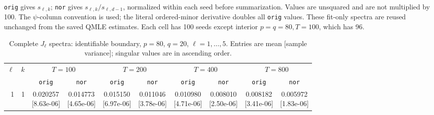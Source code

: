 \documentclass[12pt,letterpaper]{article}
\def\spacingset#1{\renewcommand{\baselinestretch}{#1}\small\normalsize}
\theoremstyle{plain}
\theoremstyle{definition}
\begin{document}
\begin{table}[p]
\begin{adjustbox}{max width=\linewidth}
\begin{tabular}{@{}rr*{8}{c}@{}}
\bottomrule
\end{tabular}
\end{adjustbox}
\par\smallskip
\begin{minipage}{0.98\linewidth}\footnotesize
\texttt{orig} gives $s_{\ell,k}$; \texttt{nor} gives $s_{\ell,k}/s_{\ell,d-1}$, normalized within each seed before summarization. Values are unsquared and are not multiplied by 100. The $\psi$-column convention is used; the literal ordered-minor derivative doubles all \texttt{orig} values. These fit-only spectra are reused unchanged from the saved QMLE estimates. Each cell has 100 seeds except interior $p=q=80,T=100$, which has 96.
\end{minipage}
\endgroup
\end{table}
\clearpage
\begin{table}[p]
\begingroup
\spacingset{1.0}
\small\centering
\caption{Complete $J_\ell$ spectra: identifiable boundary, $p=80$, $q=20$, $\ell=1,\ldots,5$. Entries are mean [sample variance]; singular values are in ascending order.}
\label{s23:lambda:alltab:spectra:p80q20boundary:1-5}
\footnotesize
\setlength{\tabcolsep}{2.2pt}
\renewcommand{\arraystretch}{1.03}
\begin{adjustbox}{max width=\linewidth}
\begin{tabular}{@{}rr*{8}{c}@{}}
\toprule
$\ell$ & $k$ & \multicolumn{2}{c}{$T=100$} & \multicolumn{2}{c}{$T=200$} & \multicolumn{2}{c}{$T=400$} & \multicolumn{2}{c}{$T=800$}\\
\cmidrule(lr){3-4}\cmidrule(lr){5-6}\cmidrule(lr){7-8}\cmidrule(lr){9-10}
 &  & \texttt{orig} & \texttt{nor} & \texttt{orig} & \texttt{nor} & \texttt{orig} & \texttt{nor} & \texttt{orig} & \texttt{nor}\\
\midrule
1 & 1 & \shortstack{0.020257\\[-1pt]{\scriptsize[8.63e-06]}} & \shortstack{0.014773\\[-1pt]{\scriptsize[4.65e-06]}} & \shortstack{0.015150\\[-1pt]{\scriptsize[6.97e-06]}} & \shortstack{0.011046\\[-1pt]{\scriptsize[3.78e-06]}} & \shortstack{0.010980\\[-1pt]{\scriptsize[4.71e-06]}} & \shortstack{0.008010\\[-1pt]{\scriptsize[2.50e-06]}} & \shortstack{0.008182\\[-1pt]{\scriptsize[3.41e-06]}} & \shortstack{0.005972\\[-1pt]{\scriptsize[1.83e-06]}}\\

\end{tabular}
\end{adjustbox}
\end{table}
\end{document}
